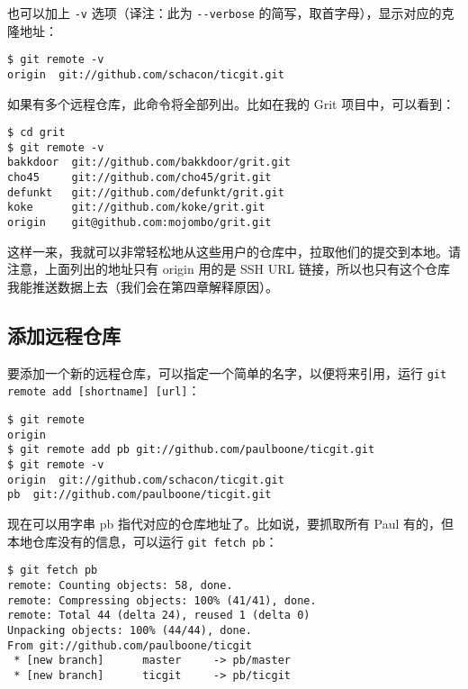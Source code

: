 \documentclass[a4paper]{book}
\begin{document}
也可以加上 \texttt{-v} 选项（译注：此为 \texttt{-{}-verbose} 的简写，取首字母），显示对应的克隆地址：

\begin{shaded}\begin{verbatim}
$ git remote -v
origin	git://github.com/schacon/ticgit.git
\end{verbatim}\end{shaded}

如果有多个远程仓库，此命令将全部列出。比如在我的 Grit 项目中，可以看到：

\begin{shaded}\begin{verbatim}
$ cd grit
$ git remote -v
bakkdoor  git://github.com/bakkdoor/grit.git
cho45     git://github.com/cho45/grit.git
defunkt   git://github.com/defunkt/grit.git
koke      git://github.com/koke/grit.git
origin    git@github.com:mojombo/grit.git
\end{verbatim}\end{shaded}

这样一来，我就可以非常轻松地从这些用户的仓库中，拉取他们的提交到本地。请注意，上面列出的地址只有 origin 用的是 SSH URL 链接，所以也只有这个仓库我能推送数据上去（我们会在第四章解释原因）。

\subsection{添加远程仓库}

要添加一个新的远程仓库，可以指定一个简单的名字，以便将来引用，运行 \texttt{git remote add {[}shortname{]} {[}url{]}}：

\begin{shaded}\begin{verbatim}
$ git remote
origin
$ git remote add pb git://github.com/paulboone/ticgit.git
$ git remote -v
origin	git://github.com/schacon/ticgit.git
pb	git://github.com/paulboone/ticgit.git
\end{verbatim}\end{shaded}

现在可以用字串 pb 指代对应的仓库地址了。比如说，要抓取所有 Paul 有的，但本地仓库没有的信息，可以运行 \texttt{git fetch pb}：

\begin{shaded}\begin{verbatim}
$ git fetch pb
remote: Counting objects: 58, done.
remote: Compressing objects: 100% (41/41), done.
remote: Total 44 (delta 24), reused 1 (delta 0)
Unpacking objects: 100% (44/44), done.
From git://github.com/paulboone/ticgit
 * [new branch]      master     -> pb/master
 * [new branch]      ticgit     -> pb/ticgit
\end{verbatim}\end{shaded}
\end{document}
